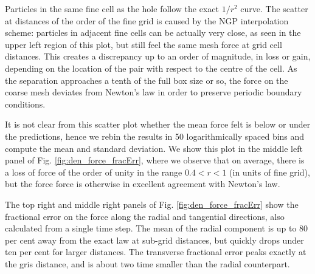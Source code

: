 Particles in the same fine cell as the hole follow the exact $1/r^{2}$ curve. The scatter at 
  distances of the order of the fine grid is caused by the NGP interpolation scheme:
  particles in adjacent fine cells can be actually very close, as seen in the upper left region of this plot,
  but still feel the same mesh force at grid cell distances.
This  creates a discrepancy up to an order of magnitude, in loss or gain, depending on the location of the pair with respect to the centre of the cell.
As the separation approaches a tenth of the full box size or so, the force on the coarse mesh deviates
from Newton's law in order to preserve periodic boundary conditions.

It is not clear from this scatter plot whether the mean force felt  is below or under the predictions, hence we rebin the results
in 50 logarithmically spaced bins and compute the mean and standard deviation. 
We show this plot in the middle left panel of Fig. \ref{fig:den_force_fracErr}, where we observe that on average,
there is a loss of force of the order of unity in the range $ 0.4 < r < 1$ (in units of fine grid), but the force force is otherwise
in excellent agreement with Newton's law.


The top right and middle right panels of Fig. \ref{fig:den_force_fracErr} show the fractional error on the force along the radial and tangential directions, also calculated from a single time step.
The mean of the radial component is up to 80 per cent away from the exact law at sub-grid distances, but quickly drops under ten per cent for larger distances. 
The transverse fractional error peaks exactly at the gris distance,  and is about two time smaller than the radial counterpart.

